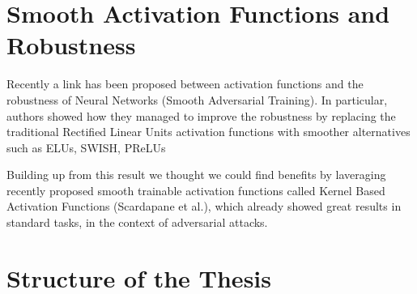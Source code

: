 \documentclass[LaM,binding=0.6cm]{./packages/sapthesis/sapthesis}
\begin{document}
%



    \section{Smooth Activation Functions and Robustness}

        Recently a link has been proposed between activation functions and the robustness of
        Neural Networks (Smooth Adversarial Training). In particular, authors showed how they managed
        to improve the robustness by replacing the traditional Rectified Linear Units activation functions
        with smoother alternatives such as ELUs, SWISH, PReLUs
        
        Building up from this result we thought we could find benefits by laveraging recently proposed smooth
        trainable activation functions called Kernel Based Activation Functions (Scardapane et al.), 
        which already showed great results in standard tasks, in the context of adversarial attacks.
        
    \section{Structure of the Thesis}
\end{document}
